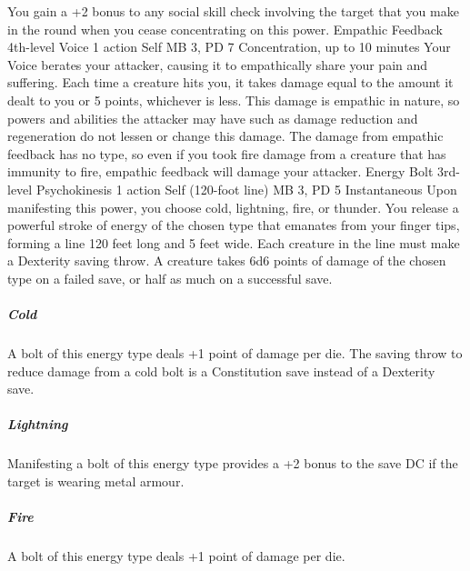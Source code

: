 You gain a +2 bonus to any social skill check involving the
target that you make in the round when you cease concentrating
on this power.
\DndPowerHeader%
    {Empathic Feedback\label{pwr:empathic_feedback}}
    {4th-level Voice}
    {1 action}
    {Self}
    {MB 3, PD 7}
    {Concentration, up to 10 minutes}
Your Voice berates your attacker, causing
it to empathically share your pain and suffering. Each time
a creature hits you, it takes damage equal to the amount it
dealt to you or 5 points, whichever is less. This damage is
empathic in nature, so powers and abilities the attacker may
have such as damage reduction and regeneration do not lessen
or change this damage. The damage from empathic feedback has
no type, so even if you took fire damage from a creature that
has immunity to fire, empathic feedback will damage your attacker.
\DndPowerHeader%
    {Energy Bolt\label{pwr:energy_bolt}}
    {3rd-level Psychokinesis}
    {1 action}
    {Self (120-foot line)}
    {MB 3, PD 5}
    {Instantaneous}
Upon manifesting this power, you choose cold,
lightning, fire, or thunder. You release a powerful stroke
of energy of the chosen type that emanates from your finger
tips, forming a line 120 feet long and 5 feet wide. Each creature
in the line must make a Dexterity saving throw. A creature
takes 6d6 points of damage of the chosen type on a failed
save, or half as much on a successful save.

\subparagraph{Cold} A bolt of this energy type deals +1 point
of damage per die. The saving throw to reduce damage from
a cold bolt is a Constitution save instead of a Dexterity
save.

\subparagraph{Lightning} Manifesting a bolt of this energy
type provides a +2 bonus to the save DC if the target is wearing
metal armour.

\subparagraph{Fire} A bolt of this energy type deals +1 point
of damage per die.

